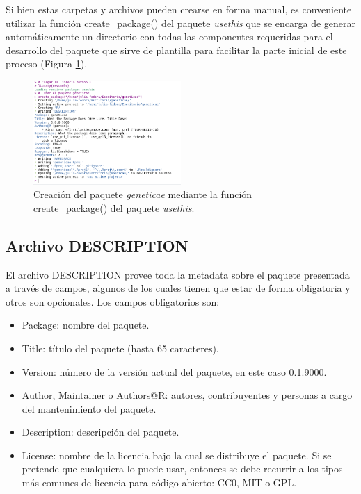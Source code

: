 Si bien estas carpetas y archivos pueden crearse en forma manual, es conveniente utilizar la función \textcolor{fandango}{create\_package()} del paquete \emph{usethis} que se encarga de generar automáticamente un directorio con todas las componentes requeridas para el desarrollo del paquete que sirve de plantilla para facilitar la parte inicial de este proceso (Figura \ref{fig:fig32}). 

\begin{figure}[h]
	\begin{center}
		\includegraphics[width=0.50\textwidth]{./Graficos/creacion.png}	
	\end{center}
	\caption{Creación del paquete \emph{geneticae} mediante la función \textcolor{fandango}{create\_package()} del paquete \emph{usethis}.}
	\label{fig:fig32}
\end{figure}


\subsection{Archivo DESCRIPTION}
\label{subsec:description}
El archivo DESCRIPTION provee toda la metadata sobre el paquete presentada a través de campos, algunos de los cuales tienen que estar de forma obligatoria y otros son opcionales. Los campos obligatorios son: 

\begin{itemize}
\item Package: nombre del paquete.
\item Title: título del paquete (hasta 65 caracteres).
\item Version: número de la versión actual del paquete, en este caso 0.1.9000.
\item Author, Maintainer o Authors@R: autores, contribuyentes y personas a cargo del mantenimiento del paquete.
\item Description: descripción del paquete.
\item License: nombre de la licencia bajo la cual se distribuye el paquete. Si se pretende que cualquiera lo puede usar, entonces se debe recurrir a los tipos más comunes de licencia para código abierto: CC0, MIT o GPL. 
\end{itemize}

